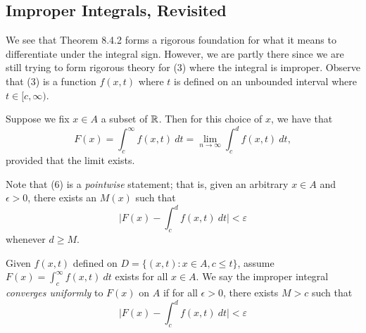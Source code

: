 \subsection{Improper Integrals, Revisited}

We see that Theorem 8.4.2 forms a rigorous foundation for what it means to differentiate under the integral sign. However, we are partly there since we are still trying to form rigorous theory for (3) where the integral is improper. Observe that (3) is a function \( f(x,t)  \) where \( t  \) is defined on an unbounded interval where \( t \in [c, \infty ) \). 

Suppose we fix \( x \in A  \) a subset of \( \mathbb{R}  \). Then for this choice of \( x  \), we have that 
\[  F(x) = \int_{ c }^{ \infty  }  f(x,t) \ dt = \lim_{ n \to \infty  } \int_{ c }^{ d } f(x,t) \ dt, \tag{6} \]
provided that the limit exists.

Note that (6) is a \textit{pointwise} statement; that is, given an arbitrary \( x \in A  \) and \( \epsilon > 0  \), there exists an \( M(x)  \) such that 
\[  \Big| F(x) - \int_{ c }^{ d }  f(x,t) \  dt  \Big| < \varepsilon \]
whenever \( d \geq M \). 
\begin{definition}{}{}
   Given \( f(x,t)  \) defined on \( D = \{ (x,t) : x \in A , c \leq t  \}  \), assume \( F(x) = \int_{ c }^{ \infty  }  f(x,t) \ dt  \) exists for all \( x \in A  \). We say the improper integral \textit{converges uniformly} to \( F(x)  \) on \( A  \) if for all \( \epsilon > 0  \), there exists \( M > c  \) such that 
   \[  \Big| F(x) - \int_{ c }^{ d }  f(x,t) \ dt \Big| < \varepsilon \]
\end{definition}

